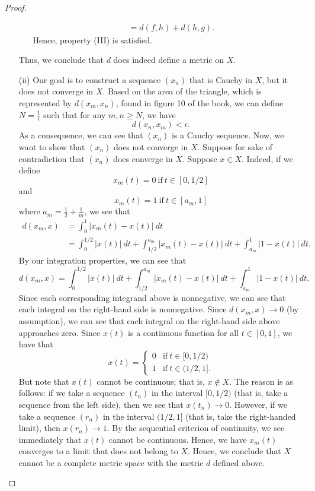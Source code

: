 \documentclass[a4paper]{article}
\begin{document}
\begin{proof}
\begin{enumerate}
\begin{enumerate}
\begin{align*}
                           &= d(f,h) + d(h,g).
                \end{align*}
                Hence, property (III) is satisfied.
        \end{enumerate}
        Thus, we conclude that \( d  \) does indeed define a metric on \( X  \).
    \item[(ii)] Our goal is to construct a sequence \( ({x}_{n}) \) that is Cauchy in \( X  \), but it does not converge in \( X  \). Based on the area of the triangle, which is represented by \( d({x}_{m}, {x}_{n}) \), found in figure 10 of the book, we can define \( N = \frac{ 1 }{ \epsilon }  \) such that for any \( m,n \geq N \), we have   
        \[  d({x}_{n}, {x}_{m}) < \epsilon. \]
        As a consequence, we can see that \( ({x}_{n}) \) is a Cauchy sequence.
        Now, we want to show that \( ({x}_{n}) \) does not converge in \( X  \). Suppose for sake of contradiction that \( ({x}_{n}) \) does converge in \( X  \). Suppose \( x \in X  \). Indeed, if we define 
        \[  {x}_{m}(t) = 0 \ \text{if} \ t \in [0,1/2] \]
        and 
        \[  {x}_{m}(t) = 1  \ \text{if} \ t \in [{a}_{m},1] \]
        where \( {a}_{m} =\frac{ 1 }{ 2 }  + \frac{ 1 }{ m }  \), we see that  
        \begin{align*}
            d({x}_{m},x) &= \int_{ 0 }^{ 1 }  | {x}_{m}(t) - x(t) |  \ dt \\
                         &= \int_{ 0 }^{ 1/2 }  | x(t) |  \ dt + \int_{ 1/2 }^{ {a}_{m} } | {x}_{m}(t) - x(t) |  \ dt + \int_{ {a}_{m} }^{ 1 }  | 1 - x(t) |  \ dt.
        \end{align*}
        By our integration properties, we can see that  
        \[  d({x}_{m},x) = \int_{ 0 }^{ 1/2 }  | x(t) |  \ dt + \int_{ 1/2 }^{ {a}_{m} } | {x}_{m}(t) - x(t) |  \ dt + \int_{ {a}_{m} }^{ 1 } | 1 - x(t) |  \ dt. \]
        Since each corresponding integrand above is nonnegative, we can see that each integral on the right-hand side is nonnegative. Since \( d({x}_{m},x) \to 0  \) (by assumption), we can see that each integral on the right-hand side above approaches zero. Since \( x(t) \) is a continuous function for all \( t \in [0,1] \), we have that 
        \[ x(t) = 
        \begin{cases}
            0 &\text{if} \ t \in [0,1/2) \\ 
            1 &\text{if} \ t  \in (1/2,1].
        \end{cases} \]
        But note that \( x(t) \) cannot be continuous; that is, \( x \notin X  \). The reason is as follows: if we take a sequence \( ({t}_{n}) \) in the interval \( [0,1/2) \) (that is, take a sequence from the left side), then we see that \( x({t}_{n}) \to 0   \). However, if we take a sequence \( ({r}_{n})  \) in the interval \( (1/2,1] \) (that is, take the right-handed limit), then \( x({r}_{n}) \to 1 \). By the sequential criterion of continuity, we see immediately that \( x(t)  \) cannot be continuous. Hence, we have \( {x}_{m}(t)  \) converges to a limit that does not belong to \( X \). Hence, we conclude that \( X  \) cannot be a complete metric space with the metric \( d  \) defined above.
\end{enumerate}
\end{proof}
\end{document}
